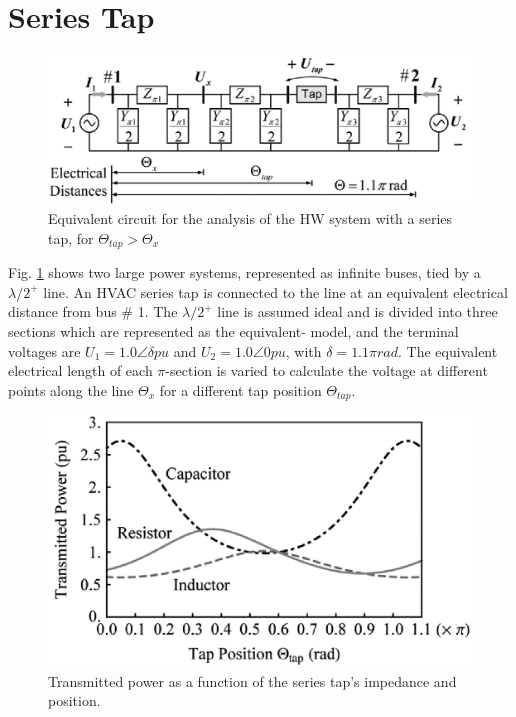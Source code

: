 \documentclass[12pt,a4paper]{reportmod}
\begin{document}
\section{Series Tap}
\begin{figure}[h]
\label{fig:seriestapckt}
\begin{center}
\includegraphics[scale=0.3]{seriestapckt.png}
\caption{Equivalent circuit for the analysis of the HW system with a series tap, for $\Theta_{tap} > \Theta_x $ }
\end{center}
\end{figure}
\par Fig. \ref{fig:seriestapckt} shows two large power systems, represented as infinite buses, tied by a $\lambda /2^+$ line. An HVAC series tap is connected to the line at an equivalent electrical distance from bus \# 1. The $\lambda /2^+$ line is assumed ideal and is divided into three sections which are represented as the equivalent- model, and the terminal voltages are $U_1 = 1.0\angle \delta pu$ and $U_2 = 1.0\angle 0 pu$, with $\delta = 1.1\pi rad$. The equivalent electrical length of each $\pi$-section is varied to calculate the voltage at different points along the line $\Theta_x$ for a different tap position $\Theta_{tap}$.
\begin{figure}[h]
\label{fig:seriestappower}
\begin{center}
\includegraphics[scale=0.3]{seriestappower.png}
\caption{Transmitted power as a function of the series tap’s impedance and position.}
\end{center}
\end{figure}
\end{document}

